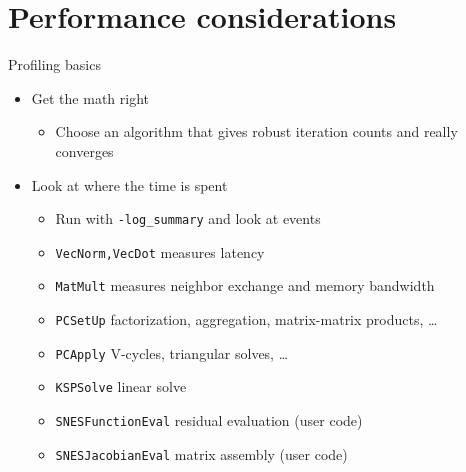 \documentclass{beamer}
\begin{document}
\section{Performance considerations}
\begin{frame}{Profiling basics}
  \begin{itemize}
  \item Get the math right
    \begin{itemize}
    \item Choose an algorithm that gives robust iteration counts and really converges
    \end{itemize}
  \item Look at where the time is spent
    \begin{itemize}
    \item Run with \texttt{-log\_summary} and look at events
    \item \texttt{VecNorm,VecDot} measures latency
    \item \texttt{MatMult} measures neighbor exchange and memory bandwidth
    \item \texttt{PCSetUp} factorization, aggregation, matrix-matrix products, \ldots
    \item \texttt{PCApply} V-cycles, triangular solves, \ldots
    \item \texttt{KSPSolve} linear solve
    \item \texttt{SNESFunctionEval} residual evaluation (user code)
    \item \texttt{SNESJacobianEval} matrix assembly (user code)
    \end{itemize}
  \end{itemize}
\end{frame}



\end{document}
